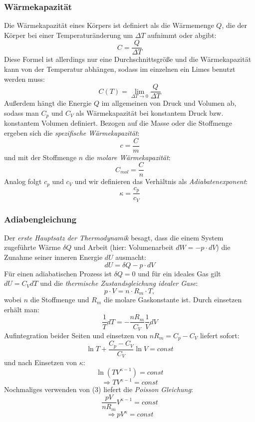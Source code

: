 \documentclass[%
   final,      %
   paper=a4, paper=portrait, pagesize=auto, %
   fontsize=11pt, %
   ngerman, %
 ]{scrartcl} %
\begin{document}
\subsubsection{Wärmekapazität}
Die Wärmekapazität eines Körpers ist definiert als die Wärmemenge $Q$, die der Körper bei einer Temperaturänderung um $\Delta T$ aufnimmt oder abgibt:
\begin{equation}
C = \frac{Q}{\Delta T}
\end{equation}
Diese Formel ist allerdings nur eine Durchschnittsgröße und die Wärmekapazität kann von der Temperatur abhängen, sodass im einzelnen ein Limes benutzt werden muss:
\begin{equation}
\nonumber
C(T) = \lim\limits_{\Delta T \rightarrow 0} \frac{Q}{\Delta T}
\end{equation}
Außerdem hängt die Energie $Q$ im allgemeinen von Druck und Volumen ab, sodass man $C_p$ und $C_V$ als Wärmekapazität bei konstantem Druck bzw. konstantem Volumen definiert. Bezogen auf die Masse oder die Stoffmenge ergeben sich die \emph{spezifische Wärmekapazität}:
\begin{equation}
\nonumber
c = \frac{C}{m}
\end{equation}
und mit der Stoffmenge $n$ die \emph{molare Wärmekapazität}:
\begin{equation}
\nonumber
C_{mol} = \frac{C}{n} 
\end{equation}
Analog folgt $c_p$ und $c_V$ und wir definieren das Verhältnis als \emph{Adiabatenexponent}:
\begin{equation}
\kappa = \frac{c_p}{c_V}
\end{equation}
\subsubsection{Adiabengleichung}
Der \emph{erste Hauptsatz der Thermodynamik} besagt, dass die einem System zugeführte Wärme $\delta Q$ und Arbeit (hier: Volumenarbeit $dW = -p\cdot dV$) die Zunahme seiner inneren Energie $dU$ ausmacht:
\begin{equation}
dU = \delta Q - p\cdot dV 
\end{equation}
Für einen adiabatischen Prozess ist $\delta Q = 0$ und für ein ideales Gas gilt $dU = C_V dT$ und die \emph{thermische Zustandsgleichung idealer Gase}:
\begin{equation}
p\cdot V = n\cdot R_m\cdot T,
\end{equation}
wobei $n$ die Stoffmenge und $R_m$ die molare Gaskonstante ist.
Durch einsetzen erhält man:
\begin{equation}
\nonumber
\frac{1}{T}dT = -\frac{nR_m}{C_V}\frac{1}{V}dV
\end{equation}
Aufintegration beider Seiten und einsetzen von $nR_m = C_p - C_V$ liefert sofort:
\begin{equation}\nonumber
\ln T + \frac{C_p - C_V}{C_V}\ln V = const
\end{equation}
und nach Einsetzen von $\kappa$:
\[
\ln (TV^{\kappa - 1}) = const\]
\[\Longrightarrow TV^{\kappa - 1} = const\]
Nochmaliges verwenden von (3) liefert die \emph{Poisson Gleichung}:
\[\frac{pV}{nR_m}V^{\kappa-1}=const\]
\begin{equation}
\Longrightarrow pV^\kappa = const
\end{equation}
\end{document}
